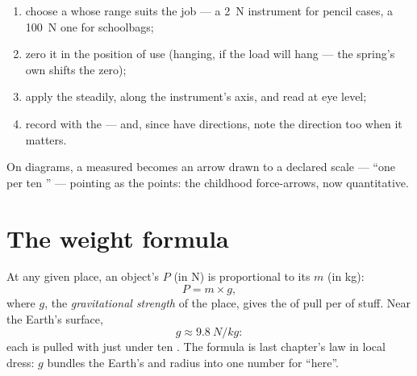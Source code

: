 \begin{method}\label{met:g9:weight-vs-mass:measure}
\begin{enumerate}
  \item choose a  whose range suits the job ---
        a \qty{2}{N} instrument for pencil cases, a
        \qty{100}{N} one for schoolbags;
  \item zero it in the position of use (hanging, if the load
        will hang --- the spring's own  shifts the
        zero);
  \item apply the  steadily, along the instrument's
        axis, and read at eye level;
  \item record with the  --- and, since  have
        directions, note the direction too when it matters.
\end{enumerate}
On diagrams, a measured  becomes an arrow drawn to a
declared scale --- ``one  per ten '' ---
pointing as the  points: the childhood force-arrows,
now quantitative.
\end{method}

\section{The weight formula}

\begin{proposition}\label{prop:g9:weight-vs-mass:formula}
At any given place, an object's  $P$ (in \unit{N}) is
proportional to its  $m$ (in \unit{kg}):
\[
P = m \times g ,
\]
where $g$, the \emph{gravitational strength} of the place, gives the  of pull per
 of stuff. Near the Earth's surface,
\[
g \approx \qty{9.8}{N/kg}:
\]
each  is pulled with just under ten . The
formula is last chapter's law in local dress: $g$ bundles the
Earth's  and radius into one number for
``here''.
\end{proposition}


